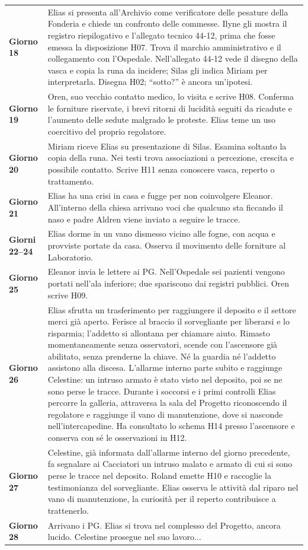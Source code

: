 \documentclass[11pt,a4paper]{article}
\begin{document}
\begin{longtable}{>{\bfseries}p{29mm} p{126mm}}
Giorno 18 & Elias si presenta all'Archivio come verificatore delle pesature della Fonderia e chiede un confronto delle commesse. Ilyne gli mostra il registro riepilogativo e l'allegato tecnico 44-12, prima che fosse emessa la disposizione H07. Trova il marchio amministrativo e il collegamento con l'Ospedale. Nell'allegato 44-12 vede il disegno della vasca e copia la runa da incidere; Silas gli indica Miriam per interpretarla. Disegna H02; ``sotto?'' è ancora un'ipotesi.\\
Giorno 19 & Oren, suo vecchio contatto medico, lo visita e scrive H08. Conferma le forniture riservate, i brevi ritorni di lucidità seguiti da ricadute e l'aumento delle sedute malgrado le proteste. Elias teme un uso coercitivo del proprio regolatore.\\
Giorno 20 & Miriam riceve Elias su presentazione di Silas. Esamina soltanto la copia della runa. Nei testi trova associazioni a percezione, crescita e possibile contatto. Scrive H11 senza conoscere vasca, reperto o trattamento.\\
Giorno 21 & Elias ha una crisi in casa e fugge per non coinvolgere Eleanor. All'interno della chiesa arrivano voci che qualcuno sta ficcando il naso e padre Aldren viene inviato a seguire le tracce.\\
Giorni 22--24 & Elias dorme in un vano dismesso vicino alle fogne, con acqua e provviste portate da casa. Osserva il movimento delle forniture al Laboratorio.\\
Giorno 25 & Eleanor invia le lettere ai PG. Nell'Ospedale sei pazienti vengono portati nell'ala inferiore; due spariscono dai registri pubblici. Oren scrive H09.\\
Giorno 26 & Elias sfrutta un trasferimento per raggiungere il deposito e il settore merci già aperto. Ferisce al braccio il sorvegliante per liberarsi e lo risparmia; l'addetto si allontana per chiamare aiuto. Rimasto momentaneamente senza osservatori, scende con l'ascensore già abilitato, senza prenderne la chiave. Né la guardia né l'addetto assistono alla discesa. L'allarme interno parte subito e raggiunge Celestine: un intruso armato è stato visto nel deposito, poi se ne sono perse le tracce. Durante i soccorsi e i primi controlli Elias percorre la galleria, attraversa la sala del Progetto riconoscendo il regolatore e raggiunge il vano di manutenzione, dove si nasconde nell'intercapedine. Ha consultato lo schema H14 presso l'ascensore e conserva con sé le osservazioni in H12.\\
Giorno 27 & Celestine, già informata dall'allarme interno del giorno precedente, fa segnalare ai Cacciatori un intruso malato e armato di cui si sono perse le tracce nel deposito. Roland emette H10 e raccoglie la testimonianza del sorvegliante. Elias osserva le attività dal riparo nel vano di manutenzione, la curiosità per il reperto contribuisce a trattenerlo.\\
Giorno 28 & Arrivano i PG. Elias si trova nel complesso del Progetto, ancora lucido. Celestine prosegue nel suo lavoro...\\
\end{longtable}
\end{document}
